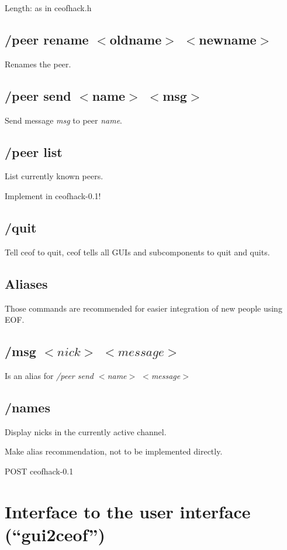 \documentclass[12pt,a4paper]{book}
\begin{document}
Length: as in ceofhack.h
\subsection{/peer rename $<$oldname$>$ $<$newname$>$}
Renames the peer.
\subsection{/peer send $<$name$>$ $<$msg$>$}
Send message \textit{msg} to peer \textit{name}.
\subsection{/peer list}
List currently known peers.

Implement in ceofhack-0.1!
\subsection{/quit}
Tell ceof to quit, ceof tells all GUIs and subcomponents to quit and quits.

\subsection{Aliases}
Those commands are recommended for easier integration of new people using EOF.
\subsection{/msg $<nick>$ $<message>$}
Is an alias for \textit{/peer send $<$name$>$ $<$message$>$}
\subsection{/names}
Display nicks in the currently active channel.

Make alias recommendation, not to be implemented directly.

POST ceofhack-0.1
\section{Interface to the user interface ("`gui2ceof"')}
\end{document}
